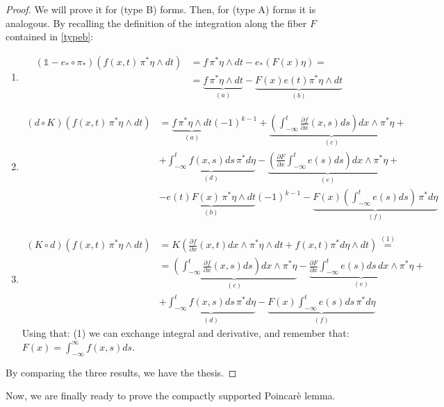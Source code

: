 \documentclass[a4paper,11pt,titlepage, article, oneside]{memoir}
\numberwithin{equation}{section}
\theoremstyle{definition}
\theoremstyle{remark}
\newcommand{\defonde}[2]{\frac{\partial {#1}}{\partial {#2}}}
\begin{document}
\begin{proof}
We will prove it for (type B) forms. Then, for (type A) forms it is analogous. By recalling the definition of the integration along the fiber $F$ contained in \eqref{typeb}:
\begin{enumerate}
\item
\begin{align*}
(\mathbb{1} - e_* \circ \pi_*)(f(x, t) \, \pi^* \eta \wedge dt ) &=f\, \pi^*\eta \wedge dt - e_*(F(x) \eta) = \\
&= \underbrace{f\, \pi^* \eta \wedge dt}_{(a)} - \underbrace{F(x) e(t) \pi^* \eta \wedge dt}_{(b)}
\end{align*}
\item 
\begin{align*}
(d \circ K)(f(x, t) \, \pi^* \eta \wedge dt) &= \underbrace{f\, \pi^* \eta \wedge dt}_{(a)}(-1)^{k-1} + \underbrace{\left( \int_{-\infty}^t \defonde{f}{x}(x, s) ds \right) dx \wedge \pi^* \eta}_{(c)} + \\
&+ \underbrace{\int_{-\infty}^t f(x, s) ds \, \pi^* d\eta}_{(d)} - \underbrace{\left( \defonde{F}{x}\int_{-\infty}^t e(s) ds \right) dx \wedge \pi^* \eta}_{(e)} + \\
&- \underbrace{e(t)F(x) \, \pi^*\eta \wedge dt}_{(b)} (-1)^{k-1} - \underbrace{F(x)\left(\int_{-\infty}^t e(s) ds \right)\, \pi^* d\eta}_{(f)}
\end{align*}
\item 
\begin{align*}
(K \circ d) (f(x, t) \, \pi^* \eta \wedge dt) &= K \left( \defonde{f}{x}(x, t) dx \wedge \pi^*\eta \wedge dt + f(x, t) \pi^* d\eta \wedge dt\right) \overset{(1)}{=} \\
&= \underbrace{\left(\int_{-\infty}^t \defonde{f}{x}(x, s) ds \right) dx \wedge \pi^*\eta}_{(c)} - \underbrace{\defonde{F}{x} \int_{-\infty}^t e(s)ds \,dx \wedge \pi^* \eta}_{(e)} + \\
&+ \underbrace{\int_{-\infty}^t f(x, s) ds \, \pi^* d\eta}_{(d)} - \underbrace{F(x) \int_{-\infty}^t e(s) ds \, \pi^* d\eta}_{(f)}
\end{align*}
Using that: (1) we can exchange integral and derivative, and remember that: $F(x) = \int_{-\infty}^{\infty} f(x, s) ds$.
\end{enumerate}
By comparing the three results, we have the thesis.
\end{proof}

Now, we are finally ready to prove the compactly supported Poincarè lemma.
\end{document}
